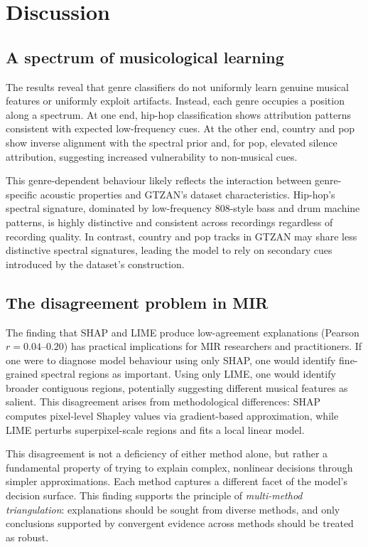 \documentclass{article}
\begin{document}
\section{Discussion}\label{sec:discussion}

\subsection{A spectrum of musicological learning}

The results reveal that genre classifiers do not uniformly learn genuine musical features or uniformly exploit artifacts. Instead, each genre occupies a position along a spectrum. At one end, hip-hop classification shows attribution patterns consistent with expected low-frequency cues. At the other end, country and pop show inverse alignment with the spectral prior and, for pop, elevated silence attribution, suggesting increased vulnerability to non-musical cues.

This genre-dependent behaviour likely reflects the interaction between genre-specific acoustic properties and GTZAN's dataset characteristics. Hip-hop's spectral signature, dominated by low-frequency 808-style bass and drum machine patterns, is highly distinctive and consistent across recordings regardless of recording quality. In contrast, country and pop tracks in GTZAN may share less distinctive spectral signatures, leading the model to rely on secondary cues introduced by the dataset's construction.

\subsection{The disagreement problem in MIR}

The finding that SHAP and LIME produce low-agreement explanations (Pearson $r = 0.04$--$0.20$) has practical implications for MIR researchers and practitioners. If one were to diagnose model behaviour using only SHAP, one would identify fine-grained spectral regions as important. Using only LIME, one would identify broader contiguous regions, potentially suggesting different musical features as salient. This disagreement arises from methodological differences: SHAP computes pixel-level Shapley values via gradient-based approximation, while LIME perturbs superpixel-scale regions and fits a local linear model.

This disagreement is not a deficiency of either method alone, but rather a fundamental property of trying to explain complex, nonlinear decisions through simpler approximations. Each method captures a different facet of the model's decision surface. This finding supports the principle of \textit{multi-method triangulation}: explanations should be sought from diverse methods, and only conclusions supported by convergent evidence across methods should be treated as robust.
\end{document}
